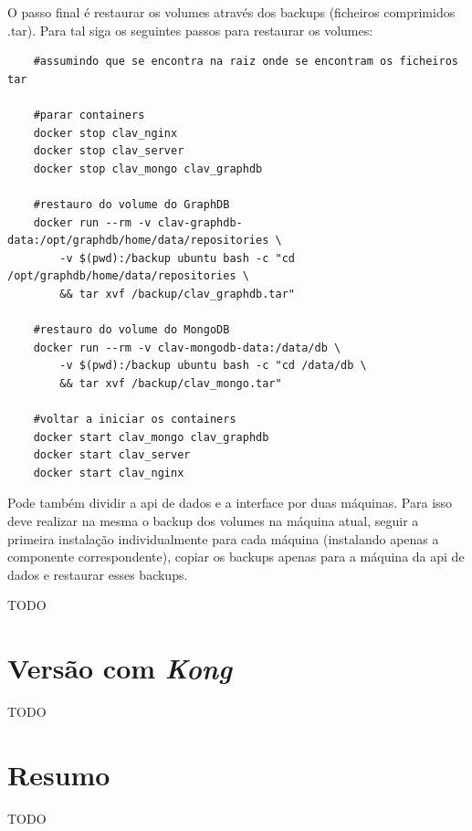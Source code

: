 O passo final é restaurar os volumes através dos backups (ficheiros comprimidos .tar). Para tal siga os seguintes passos para restaurar os volumes:
\begin{verbatim}
    #assumindo que se encontra na raiz onde se encontram os ficheiros tar

    #parar containers
    docker stop clav_nginx
    docker stop clav_server
    docker stop clav_mongo clav_graphdb
    
    #restauro do volume do GraphDB
    docker run --rm -v clav-graphdb-data:/opt/graphdb/home/data/repositories \
        -v $(pwd):/backup ubuntu bash -c "cd /opt/graphdb/home/data/repositories \
        && tar xvf /backup/clav_graphdb.tar"
        
    #restauro do volume do MongoDB
    docker run --rm -v clav-mongodb-data:/data/db \
        -v $(pwd):/backup ubuntu bash -c "cd /data/db \
        && tar xvf /backup/clav_mongo.tar"
        
    #voltar a iniciar os containers
    docker start clav_mongo clav_graphdb
    docker start clav_server
    docker start clav_nginx
\end{verbatim}

Pode também dividir a \acrshort{api} de dados e a interface por duas máquinas. Para isso deve realizar na mesma o backup dos volumes na máquina atual, seguir a primeira instalação individualmente para cada máquina (instalando apenas a componente correspondente), copiar os backups apenas para a máquina da \acrshort{api} de dados e restaurar esses backups.

TODO

\section{Versão com \textit{Kong}}\label{sec:deployKong}

TODO

\section{Resumo}

TODO
